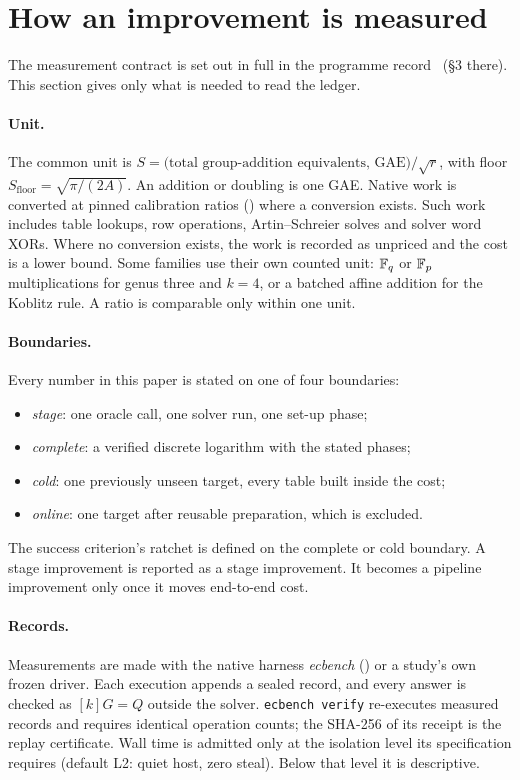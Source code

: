 \section{How an improvement is measured}\label{sec:measure}

The measurement contract is set out in full in the programme
record~\cite{icprogram2026} (\S3 there). This section gives only what is
needed to read the ledger.

\paragraph{Unit.} The common unit is
$S=\text{(total group-addition equivalents, GAE)}/\sqrt r$, with floor
$S_{\mathrm{floor}}=\sqrt{\pi/(2A)}$. An addition or doubling is one GAE.
Native work is converted at pinned calibration ratios
() where a conversion exists. Such work
includes table lookups, row operations, Artin--Schreier solves and solver
word XORs. Where no conversion exists, the work is recorded as unpriced and
the cost is a lower bound. Some families use their own counted unit: $\mathbb{F}_q$
or $\mathbb{F}_p$ multiplications for genus three and $k=4$, or a batched affine
addition for the Koblitz rule. A ratio is comparable only within one unit.

\paragraph{Boundaries.} Every number in this paper is stated on one of four
boundaries:
\begin{itemize}
\item \emph{stage}: one oracle call, one solver run, one set-up phase;
\item \emph{complete}: a verified discrete logarithm with the stated phases;
\item \emph{cold}: one previously unseen target, every table built inside
  the cost;
\item \emph{online}: one target after reusable preparation, which is
  excluded.
\end{itemize}
The success criterion's ratchet is defined on the complete or cold boundary.
A stage improvement is reported as a stage improvement. It becomes a
pipeline improvement only once it moves end-to-end cost.

\paragraph{Records.} Measurements are made with the native harness
\emph{ecbench} () or a study's own frozen
driver. Each execution appends a sealed record, and every answer is checked
as $[k]G=Q$ outside the solver. \texttt{ecbench verify} re-executes measured
records and requires identical operation counts; the SHA-256 of its receipt
is the replay certificate. Wall time is admitted only at the isolation
level its specification requires (default L2: quiet host, zero steal). Below
that level it is descriptive.

